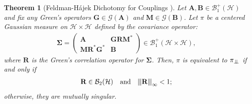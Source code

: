 \documentclass[noinfoline]{imsart}\setcounter{tocdepth}{2}
\newcommand{\m}[1]{\mathbf{#1}}
\renewcommand{\c}[1]{\mathcal{#1}}
\newcommand{\indep}{\perp\mkern-9.5mu\perp}
\newcommand{\vertiii}[1]{{\left\vert\kern-0.25ex\left\vert\kern-0.25ex\left\vert #1 
    \right\vert\kern-0.25ex\right\vert\kern-0.25ex\right\vert}} %
\theoremstyle{plain}
\newtheorem{theorem}{Theorem}[section]
\begin{document}
\begin{theorem}[Feldman-Hájek Dichotomy for Couplings \cite{da2006introduction}]\label{thm:feld:coup}
Let $\m{A}, \m{B} \in \c{B}_{1}^{+}(\c{H})$ and fix any Green's operators $\m{G} \in \c{G}(\m{A})$ and $\m{M} \in \c{G}(\m{B})$. Let $\pi$ be a centered Gaussian measure on $\c{H} \times \c{H}$ defined by the covariance operator:
\begin{align*}
    \m{\Sigma} = \left(
    \begin{array}{c|c}
    \m{A} & \m{G} \m{R} \m{M}^* \\
    \hline
    \m{M} \m{R}^* \m{G}^* & \m{B}
    \end{array}
    \right) \in \c{B}_{1}^{+}(\c{H} \times \c{H}),
\end{align*}
where $\m{R}$ is the Green's correlation operator for $\m{\Sigma}$. Then, $\pi$ is equivalent to $\pi_{\indep}$ if and only if
\begin{align}\label{eq:FH:dicho}
     \m{R} \in \c{B}_{2}(\c{H}) \quad \text{and} \quad \vertiii{\m{R}}_{\infty} < 1;
\end{align}
otherwise, they are mutually singular.
\end{theorem}
\end{document}
